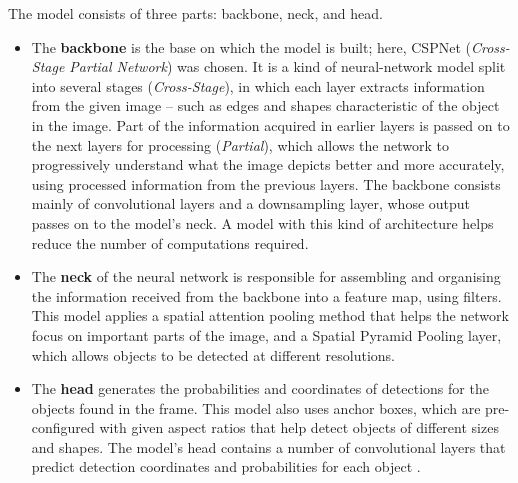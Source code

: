 The model consists of three parts: backbone, neck, and head.

\begin{itemize}
\item
  The \textbf{backbone} is the base on which the model is built; here, CSPNet (\emph{Cross-Stage Partial Network}) was chosen. It is a kind of neural-network model split into several stages (\emph{Cross-Stage}), in which each layer extracts information from the given image -- such as edges and shapes characteristic of the object in the image. Part of the information acquired in earlier layers is passed on to the next layers for processing (\emph{Partial}), which allows the network to progressively understand what the image depicts better and more accurately, using processed information from the previous layers. The backbone consists mainly of convolutional layers and a downsampling layer, whose output passes on to the model's neck. A model with this kind of architecture helps reduce the number of computations required.
\item
  The \textbf{neck} of the neural network is responsible for assembling and organising the information received from the backbone into a feature map, using filters. This model applies a spatial attention pooling method that helps the network focus on important parts of the image, and a Spatial Pyramid Pooling layer, which allows objects to be detected at different resolutions.
\item
  The \textbf{head} generates the probabilities and coordinates of detections for the objects found in the frame. This model also uses anchor boxes, which are pre-configured with given aspect ratios that help detect objects of different sizes and shapes. The model's head contains a number of convolutional layers that predict detection coordinates and probabilities for each object \cite{ref55}.
\end{itemize}
